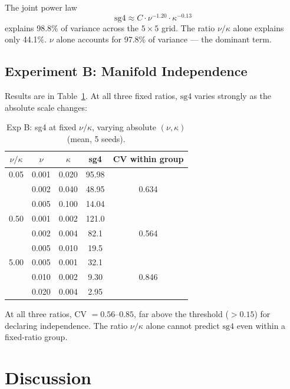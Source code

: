 \documentclass[11pt]{article}
\begin{document}
The joint power law
\begin{equation}
\boxed{\mathrm{sg4} \approx C \cdot \nu^{-1.20} \cdot \kappa^{-0.13}}
\label{eq:powerlaw}
\end{equation}
explains 98.8\% of variance across the $5 \times 5$ grid. The ratio $\nu/\kappa$ alone
explains only 44.1\%. $\nu$ alone accounts for 97.8\% of variance --- the dominant term.

\subsection{Experiment B: Manifold Independence}

Results are in Table~\ref{tab:expB}. At all three fixed ratios, $\mathrm{sg4}$ varies
strongly as the absolute scale changes:

\begin{table}[h]
\centering
\small
\caption{Exp B: sg4 at fixed $\nu/\kappa$, varying absolute $(\nu, \kappa)$ (mean, 5 seeds).}
\label{tab:expB}
\begin{tabular}{ccccc}
\toprule
$\nu/\kappa$ & $\nu$ & $\kappa$ & sg4 & CV within group \\
\midrule
0.05 & 0.001 & 0.020 & 95.98 & \multirow{3}{*}{0.634} \\
     & 0.002 & 0.040 & 48.95 & \\
     & 0.005 & 0.100 & 14.04 & \\
\midrule
0.50 & 0.001 & 0.002 & 121.0 & \multirow{3}{*}{0.564} \\
     & 0.002 & 0.004 & 82.1  & \\
     & 0.005 & 0.010 & 19.5  & \\
\midrule
5.00 & 0.005 & 0.001 & 32.1  & \multirow{3}{*}{0.846} \\
     & 0.010 & 0.002 & 9.30  & \\
     & 0.020 & 0.004 & 2.95  & \\
\bottomrule
\end{tabular}
\end{table}

At all three ratios, CV $= 0.56$--$0.85$, far above the threshold ($> 0.15$) for
declaring independence. The ratio $\nu/\kappa$ alone cannot predict $\mathrm{sg4}$ even
within a fixed-ratio group.

\section{Discussion}
\end{document}
